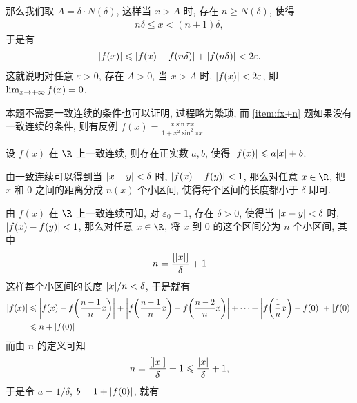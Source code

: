 \begin{exercise}[series=exer]
\begin{answer}
      那么我们取 $ A = \delta \cdot N(\delta) $, 这样当 $ x > A $ 时, 存在 $ n \ge N(\delta) $, 使得
      \begin{align*}
          n\delta \le x < (n + 1)\delta,
      \end{align*}
      于是有
      \begin{align*}
          \abs{f(x)} \leqslant \abs{f(x) - f(n\delta)} + \abs{f(n\delta)} < 2\varepsilon.
      \end{align*}
      这就说明对任意 $ \varepsilon > 0 $, 存在 $ A > 0 $, 当 $ x > A $ 时, $ \abs{f(x)} < 2\varepsilon $, 即 $ \lim_{x \to +\infty} f(x) = 0 $.
  \end{answer}
  \begin{remark}
      本题不需要一致连续的条件也可以证明, 过程略为繁琐, 而 \ref{item:fx+n} 题如果没有一致连续的条件, 则有反例 $ f(x) = \frac{x\sin \pi x}{1 + x^{2} \sin^{2} \pi x} $
  \end{remark}
  \item\label{item:一致连续可以被控制} 设 $ f(x) $ 在 $ \R $ 上一致连续, 则存在正实数 $ a, b $, 使得 $ \abs{f(x)} \leqslant a\abs{x} + b $.
  \begin{hint}
      由一致连续可以得到当 $ \abs{x - y} < \delta $ 时, $ \abs{f(x) - f(y)} < 1 $, 那么对任意 $ x \in \R $, 把 $ x $ 和 $ 0 $ 之间的距离分成 $ n(x) $ 个小区间, 使得每个区间的长度都小于 $ \delta $ 即可.
  \end{hint}
  \begin{answer}
      由 $ f(x) $ 在 $ \R $ 上一致连续可知, 对 $ \varepsilon_{0} = 1 $, 存在 $ \delta > 0 $, 使得当 $ \abs{x - y} < \delta $ 时, $ \abs{f(x) - f(y)} < 1 $, 那么对任意 $ x \in \R $, 将 $ x $ 到 $ 0 $ 的这个区间分为 $ n $ 个小区间, 其中
      \begin{align*}
          n = \frac{[\abs{x}]}{\delta} + 1
      \end{align*}
      这样每个小区间的长度 $ \abs{x}/n < \delta $, 于是就有
      \begin{align*}
          \abs{f(x)} & \leqslant \abs{f(x) - f\qty(\frac{n - 1}{n}x)} + \abs{f\qty(\frac{n - 1}{n}x) - f\qty(\frac{n - 2}{n}x)} + \dots + \abs{f\qty(\frac{1}{n}x) - f(0)} + \abs{f(0)}\\
          & \leqslant n + \abs{f(0)}
      \end{align*}
      而由 $ n $ 的定义可知
      \begin{align*}
          n = \frac{[\abs{x}]}{\delta} + 1 \leqslant \frac{\abs{x}}{\delta} + 1,
      \end{align*}
      于是令 $ a = 1/\delta $, $ b = 1 + \abs{f(0)} $, 就有

\end{answer}
\end{exercise}

